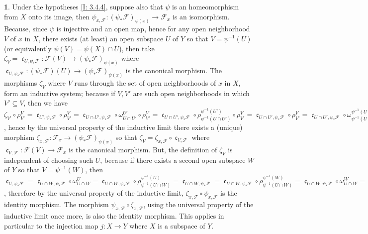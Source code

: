 \documentclass[12pt]{amsart}
\newcommand{\can}{\operatorname{\mathfrak{c}}}
\theoremstyle{definition}
\newtheorem{bk}[proposition]{}
\begin{document}
\begin{bk}\label{I: 3.4.5} Under the hypotheses \ref{I: 3.4.4}, suppose also that $\psi$ is an homeomorphism from $X$ onto its image, then
$\psi_{x,\mathscr{F}}:(\psi_{\ast}\mathscr{F})_{\psi(x)}
\rightarrow\mathscr{F}_{x}$ is an isomorphism. Because, since $\psi$ is injective and an open map, hence for any open neighborhood $V$ of $x$ in $X$, there exists (at least) an open subspace $U$ of $Y$ so that $V=\psi^{-1}(U)$ (or equivalently $\psi(V)=\psi(X)\cap U$), then take $\zeta_{V}=\can_{U,\psi_{\ast}\mathscr{F}}:\mathscr{F}(V)
\rightarrow(\psi_{\ast}\mathscr{F})_{\psi(x)}$ where  $\can_{U,\psi_{\ast}\mathscr{F}}
:(\psi_{\ast}\mathscr{F})(U)\rightarrow(\psi_{\ast}\mathscr{F})_{\psi(x)}$ is the canonical morphism. The morphisms $\zeta_{V}$ where $V$ runs through the set of open neighborhoods of $x$ in $X$, form an inductive system; because if $V,V'$ are such open neighborhoods in which $V'\subseteq V$, then we have $\zeta_{V'}\circ\rho_{V'}^{V}=
\can_{U',\psi_{\ast}\mathscr{F}}\circ\rho_{V'}^{V}=
\can_{U\cap U',\psi_{\ast}\mathscr{F}}\circ\omega_{U\cap U'}^{U'}\circ\rho_{V'}^{V}=\can_{U\cap U',\psi_{\ast}\mathscr{F}}\circ\rho_{\psi^{-1}(U\cap U')}^{\psi^{-1}( U')} \circ\rho_{V'}^{V}=\can_{U\cap U',\psi_{\ast}\mathscr{F}}\circ\rho_{V'}^{V}=\can_{U\cap U',\psi_{\ast}\mathscr{F}}\circ\omega_{\psi^{-1}(U\cap U')}^{\psi^{-1}( U)}=\can_{U,\psi_{\ast}\mathscr{F}}=\zeta_{V}$, hence by the universal property of the inductive limit there exists a (unique) morphism $\zeta_{x,\mathscr{F}}:
\mathscr{F}_{x}\rightarrow(\psi_{\ast}\mathscr{F})_{\psi(x)}$ so that $\zeta_{V}=\zeta_{x,\mathscr{F}}\circ\can_{V,\mathscr{F}}$ where $\can_{V,\mathscr{F}}:\mathscr{F}(V)\rightarrow\mathscr{F}_{x}$ is the canonical morphism. But, the definition of $\zeta_{V}$ is independent of choosing such $U$, because if there exists a second open subspace $W$ of $Y$ so that $V=\psi^{-1}(W)$, then $\can_{U,\psi_{\ast}\mathscr{F}}=\can_{U\cap W,\psi_{\ast}\mathscr{F}}\circ\omega_{U\cap W}^{U}=\can_{U\cap W,\psi_{\ast}\mathscr{F}}\circ\rho_{\psi^{-1}(U\cap W)}^{\psi^{-1}(U)}=\can_{U\cap W,\psi_{\ast}\mathscr{F}}=\can_{U\cap W,\psi_{\ast}\mathscr{F}}\circ\rho_{\psi^{-1}(U\cap W)}^{\psi^{-1}(W)}=\can_{U\cap W,\psi_{\ast}\mathscr{F}}\circ\omega_{U\cap W}^{W}=\can_{W,\psi_{\ast}\mathscr{F}}$, therefore by the universal property of the inductive limit,  $\zeta_{x,\mathscr{F}}\circ\psi_{x,\mathscr{F}}$ is the identity morphism. The morphism $\psi_{x,\mathscr{F}}\circ\zeta_{x,\mathscr{F}}$, using the universal property of the inductive limit once more, is also the identity morphism. 
 This applies in particular to the injection map $j:X\rightarrow Y$ where $X$ is a subspace of $Y$. 

\end{bk}
\end{document}
